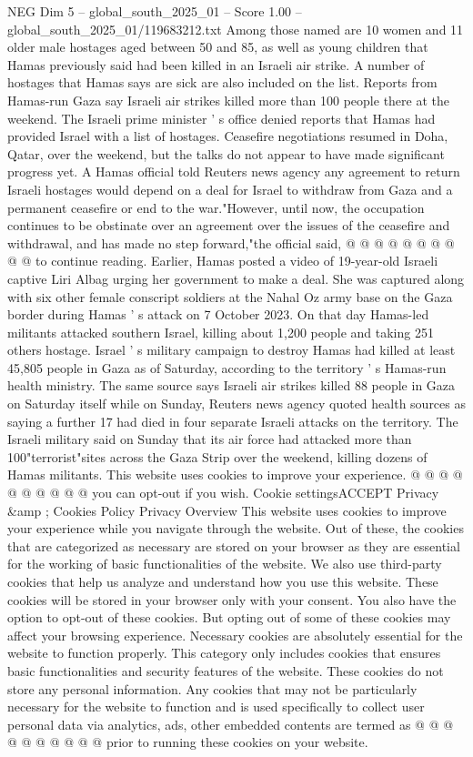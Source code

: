 \begin{textsample}{NEG Dim 5 – global\_south\_2025\_01 – Score 1.00 – global\_south\_2025\_01/119683212.txt}  \label{ex:f5_neg_158}
Among those named are 10 women and 11 older male hostages aged between 50 and 85, as well as young children that Hamas previously said had been killed in an Israeli air strike.
A number of hostages that Hamas says are sick are also included on the list.
Reports from Hamas-run Gaza say Israeli air strikes killed more than 100 people there at the weekend.
The Israeli prime minister ' s office denied reports that Hamas had provided Israel with a list of hostages.
Ceasefire negotiations resumed in Doha, Qatar, over the weekend, but the talks do not appear to have made significant progress yet.
A Hamas official told Reuters news agency any agreement to return Israeli hostages would depend on a deal for Israel to withdraw from Gaza and a permanent ceasefire or end to the war."However, until now, the occupation continues to be obstinate over an agreement over the issues of the ceasefire and withdrawal, and has made no step forward,"the official said, @ @ @ @ @ @ @ @ @ @ to continue reading.
Earlier, Hamas posted a video of 19-year-old Israeli captive Liri Albag urging her government to make a deal.
She was captured along with six other female conscript soldiers at the Nahal Oz army base on the Gaza border during Hamas ' s attack on 7 October 2023.
On that day Hamas-led militants attacked southern Israel, killing about 1,200 people and taking 251 others hostage.
Israel ' s military campaign to destroy Hamas had killed at least 45,805 people in Gaza as of Saturday, according to the territory ' s Hamas-run health ministry.
The same source says Israeli air strikes killed 88 people in Gaza on Saturday itself while on Sunday, Reuters news agency quoted health sources as saying a further 17 had died in four separate Israeli attacks on the territory.
The Israeli military said on Sunday that its air force had attacked more than 100"terrorist"sites across the Gaza Strip over the weekend, killing dozens of Hamas militants.
This website uses cookies to improve your experience. @ @ @ @ @ @ @ @ @ @ you can opt-out if you wish.
Cookie settingsACCEPT Privacy \&amp ; Cookies Policy Privacy Overview This website uses cookies to improve your experience while you navigate through the website.
Out of these, the cookies that are categorized as necessary are stored on your browser as they are essential for the working of basic functionalities of the website.
We also use third-party cookies that help us analyze and understand how you use this website.
These cookies will be stored in your browser only with your consent.
You also have the option to opt-out of these cookies.
But opting out of some of these cookies may affect your browsing experience.
Necessary cookies are absolutely essential for the website to function properly.
This category only includes cookies that ensures basic functionalities and security features of the website.
These cookies do not store any personal information.
Any cookies that may not be particularly necessary for the website to function and is used specifically to collect user personal data via analytics, ads, other embedded contents are termed as @ @ @ @ @ @ @ @ @ @ prior to running these cookies on your website.

\end{textsample}
